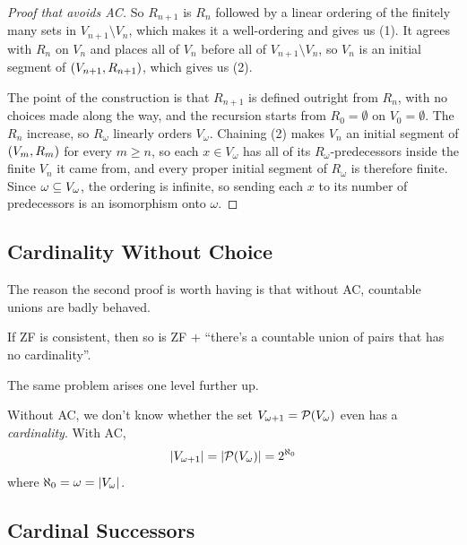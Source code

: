 \begin{proof}[Proof that avoids AC]
    So $R_{n+1}$ is $R_n$ followed by a linear ordering of the finitely many sets in $V_{n+1} \setminus V_n$, which makes it a well-ordering and gives us (1). It agrees with $R_n$ on $V_n$ and places all of $V_n$ before all of $V_{n+1} \setminus V_n$, so $V_n$ is an initial segment of $\left( V_{n+1}, R_{n+1} \right)$, which gives us (2).

    The point of the construction is that $R_{n+1}$ is defined outright from $R_n$, with no choices made along the way, and the recursion starts from $R_0 = \emptyset$ on $V_0 = \emptyset$. The $R_n$ increase, so $R_{\omega}$ linearly orders $V_{\omega}$. Chaining (2) makes $V_n$ an initial segment of $\left( V_m, R_m \right)$ for every $m \geq n$, so each $x \in V_{\omega}$ has all of its $R_{\omega}$-predecessors inside the finite $V_n$ it came from, and every proper initial segment of $R_{\omega}$ is therefore finite. Since $\omega \subseteq V_{\omega}$, the ordering is infinite, so sending each $x$ to its number of predecessors is an isomorphism onto $\omega$.
\end{proof}

\subsection{Cardinality Without Choice}

The reason the second proof is worth having is that without AC, countable unions are badly behaved.

\begin{remark}
    If ZF is consistent, then so is ZF $+$ ``there's a countable union of pairs that has no cardinality''.
\end{remark}

The same problem arises one level further up.

\begin{remark}
    Without AC, we don't know whether the set $V_{\omega + 1} = \mathcal{P}\!\left( V_{\omega} \right)$ even has a \textit{cardinality}. With AC,
    \begin{align*}
        \left\lvert V_{\omega + 1} \right\rvert = \left\lvert \mathcal{P}\!\left( V_{\omega} \right) \right\rvert = 2^{\aleph_0}
    \end{align*}
    where $\aleph_0 = \omega = \left\lvert V_{\omega} \right\rvert$.
\end{remark}

\subsection{Cardinal Successors}

